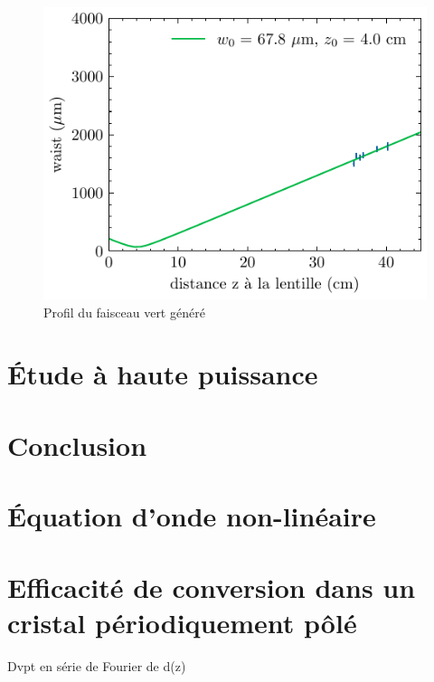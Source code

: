 \documentclass[11pt,a4paper]{article}
\begin{document}
\begin{figure}[h]
	\centering
	\includegraphics{./img/waist faisceau vert.pdf}
	\caption{Profil du faisceau vert généré}
	\label{fig:vert}
\end{figure}

\section{Étude à haute puissance}

\section{Conclusion}

\appendix
\section{\'Equation d'onde non-linéaire}
\label{NL}
\cite{boyd}

\section{Efficacité de conversion dans un cristal périodiquement pôlé}
Dvpt en série de Fourier de d(z)
\label{BK}





\end{document}
